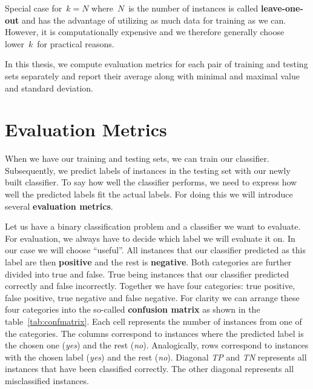 Special case for~$k=N$ where~$N$~is the number of instances is called {\bf leave-one-out} and has the advantage of 
utilizing as much data for training as we can.
However, it is computationally expensive and we therefore generally choose lower~$k$~for practical reasons.

In this thesis, we compute evaluation metrics for each pair of training and testing sets separately and report their average along with minimal and maximal value and standard deviation.


\section{Evaluation Metrics}

When we have our training and testing sets, we can train our classifier.
Subsequently, we predict labels of instances in the testing set with our newly
built classifier.
To say how well the classifier performs, we need to express how well the predicted
labels fit the actual labels.
For doing this we will introduce several {\bf evaluation metrics}.

Let us have a binary classification problem and a classifier we want to evaluate.
For evaluation, we always have to decide which label we will evaluate it on.
In our case we will choose ``useful''.
All instances that our classifier predicted as this label are then {\bf positive} and the rest is {\bf negative}.
Both categories are further divided into true and false.
True being instances that our classifier predicted correctly and false incorrectly.
Together we have four categories:
true positive, false positive, true negative and false negative.
For clarity we can arrange these four categories into the so-called {\bf confusion matrix} as shown in the table~\ref{tab:confmatrix}.
Each cell represents the number of instances from one of the categories.
The columns correspond to instances where the predicted label is the chosen one (\textit{yes}) and the rest (\textit{no}).
Analogically, rows correspond to instances with the chosen label (\textit{yes}) and the rest (\textit{no}).
Diagonal {\it TP} and {\it TN} represents all instances that have been classified correctly.
The other diagonal represents all misclassified instances.




